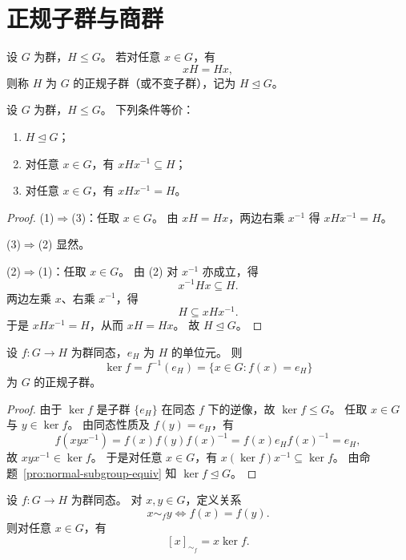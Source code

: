 \documentclass[lang=cn,a4paper,newtx]{elegantbook}
\begin{document}
\section{正规子群与商群}

\begin{definition}[正规子群]
设 $G$ 为群，$H\le G$。
若对任意 $x\in G$，有
\[
  xH=Hx,
\]
则称 $H$ 为 $G$ 的正规子群（或不变子群），记为 $H\trianglelefteq G$。
\end{definition}

\begin{proposition}\label{normal-subgroup-equiv}
设 $G$ 为群，$H\le G$。
下列条件等价：
\begin{enumerate}
  \item $H\trianglelefteq G$；
  \item 对任意 $x\in G$，有 $xHx^{-1}\subseteq H$；
  \item 对任意 $x\in G$，有 $xHx^{-1}=H$。
\end{enumerate}
\end{proposition}

\begin{proof}
(1)$\Rightarrow$(3)：任取 $x\in G$。
由 $xH=Hx$，两边右乘 $x^{-1}$ 得 $xHx^{-1}=H$。

(3)$\Rightarrow$(2) 显然。

(2)$\Rightarrow$(1)：任取 $x\in G$。
由 (2) 对 $x^{-1}$ 亦成立，得
\[
  x^{-1}Hx\subseteq H.
\]
两边左乘 $x$、右乘 $x^{-1}$，得
\[
  H\subseteq xHx^{-1}.
\]
于是 $xHx^{-1}=H$，从而 $xH=Hx$。
故 $H\trianglelefteq G$。
\end{proof}

\begin{proposition}
设 $f:G\to H$ 为群同态，$e_H$ 为 $H$ 的单位元。
则
\[
  \ker f=f^{-1}(e_H)=\{x\in G:f(x)=e_H\}
\]
为 $G$ 的正规子群。
\end{proposition}

\begin{proof}
由于 $\ker f$ 是子群 $\{e_H\}$ 在同态 $f$ 下的逆像，故 $\ker f\le G$。
任取 $x\in G$ 与 $y\in \ker f$。
由同态性质及 $f(y)=e_H$，有
\[
  f(xyx^{-1})=f(x)f(y)f(x)^{-1}=f(x)e_H f(x)^{-1}=e_H,
\]
故 $xyx^{-1}\in \ker f$。
于是对任意 $x\in G$，有 $x(\ker f)x^{-1}\subseteq \ker f$。
由命题~\ref{pro:normal-subgroup-equiv} 知 $\ker f\trianglelefteq G$。
\end{proof}

\begin{proposition}
设 $f:G\to H$ 为群同态。
对 $x,y\in G$，定义关系
\[
  x\sim_f y\iff f(x)=f(y).
\]
则对任意 $x\in G$，有
\[
  [x]_{\sim_f}=x\ker f.
\]
\end{proposition}
\end{document}
